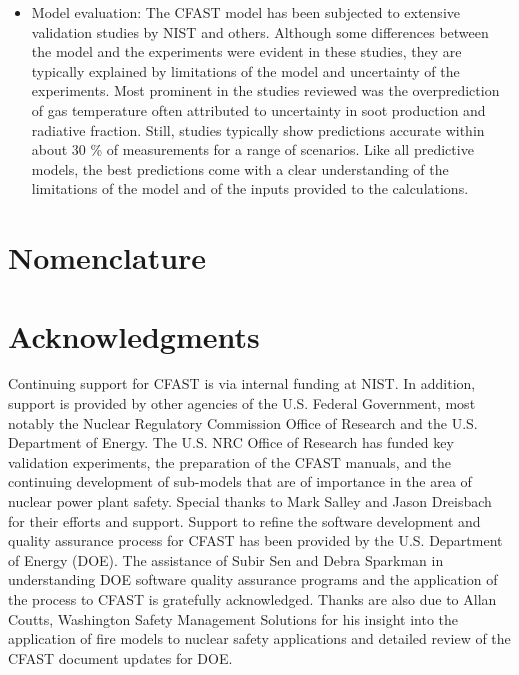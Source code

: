 \documentclass[12pt]{book}
\begin{document}
\begin{itemize}
\item Model evaluation: The CFAST model has been subjected to extensive validation studies
by NIST and others. Although some differences between the model and the experiments
were evident in these studies, they are typically explained by limitations of the model and
uncertainty of the experiments. Most prominent in the studies reviewed was the overprediction
of gas temperature often attributed to uncertainty in soot production and
radiative fraction. Still, studies typically show predictions accurate within about 30 \%
of measurements for a range of scenarios. Like all predictive models, the best predictions
come with a clear understanding of the limitations of the model and of the inputs
provided to the calculations.

\end{itemize}

\chapter{Nomenclature}


\chapter{Acknowledgments}

\label{acksection}

Continuing support for CFAST is via internal funding at NIST. In addition, support is provided by other agencies of the U.S. Federal Government, most notably the Nuclear Regulatory Commission Office of Research and the U.S. Department of Energy. The U.S. NRC Office of Research has funded key validation experiments, the preparation
of the CFAST manuals, and the continuing development of sub-models that are of importance in the area of nuclear power plant safety. Special thanks to Mark Salley and Jason Dreisbach for their efforts and support. Support to refine the software development and quality assurance process for CFAST has been provided by the U.S. Department of Energy (DOE). The assistance of Subir Sen and Debra Sparkman in understanding DOE software quality assurance programs and the application of the process to CFAST is gratefully acknowledged.  Thanks are also due to Allan Coutts, Washington Safety Management Solutions for his insight into the application of fire models to nuclear safety applications and detailed review of the CFAST document updates for DOE.


\tableofcontents

\listoffigures

\listoftables

\mainmatter





\backmatter




\appendix

\pagestyle{empty}


\end{document}
